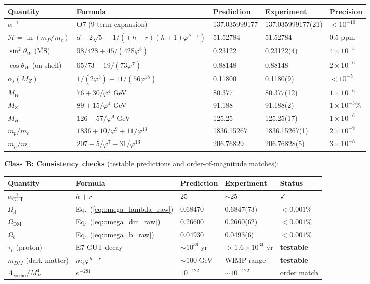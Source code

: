\documentclass[11pt,a4paper]{article}
\begin{document}
\begin{center}
\begin{tabular}{|l|l|l|l|l|}
\hline
\textbf{Quantity} & \textbf{Formula} & \textbf{Prediction} & \textbf{Experiment} & \textbf{Precision} \\
\hline
$\alpha^{-1}$ & O7 (9-term expansion) & 137.035999177 & 137.035999177(21) & $< 10^{-10}$ \\
$\mathcal{H} = \ln(m_P/m_e)$ & $d - 2\sqrt{5} - 1/((h{-}r)(h{+}1)\varphi^{h-r})$ & 51.52784 & 51.52784 & 0.5 ppm \\
$\sin^2\theta_W$ ($\overline{\text{MS}}$) & $98/428 + 45/(428\varphi^8)$ & 0.23122 & 0.23122(4) & $4 \times 10^{-5}$ \\
$\cos\theta_W$ (on-shell) & $65/73 - 19/(73\varphi^7)$ & 0.88148 & 0.88148 & $2 \times 10^{-6}$ \\
$\alpha_s(M_Z)$ & $1/(2\varphi^3) - 11/(56\varphi^{18})$ & 0.11800 & 0.1180(9) & $< 10^{-5}$ \\
$M_W$ & $76 + 30/\varphi^4$ GeV & 80.377 & 80.377(12) & $1 \times 10^{-6}$ \\
$M_Z$ & $89 + 15/\varphi^4$ GeV & 91.188 & 91.188(2) & $1 \times 10^{-3}\%$ \\
$M_H$ & $126 - 57/\varphi^9$ GeV & 125.25 & 125.25(17) & $1 \times 10^{-6}$ \\
$m_p/m_e$ & $1836 + 10/\varphi^{9} + 11/\varphi^{13}$ & 1836.15267 & 1836.15267(1) & $2 \times 10^{-9}$ \\
$m_\mu/m_e$ & $207 - 5/\varphi^{7} - 31/\varphi^{13}$ & 206.76829 & 206.76828(5) & $3 \times 10^{-8}$ \\
\hline
\end{tabular}
\end{center}

\textbf{Class B: Consistency checks} (testable predictions and order-of-magnitude matches):

\begin{center}
\begin{tabular}{|l|l|l|l|l|}
\hline
\textbf{Quantity} & \textbf{Formula} & \textbf{Prediction} & \textbf{Experiment} & \textbf{Status} \\
\hline
$\alpha_{\text{GUT}}^{-1}$ & $h + r$ & 25 & $\sim 25$ & $\checkmark$ \\
$\Omega_\Lambda$ & Eq.~(\ref{eq:omega_lambda_raw}) & 0.68470 & 0.6847(73) & $< 0.001\%$ \\
$\Omega_{\text{DM}}$ & Eq.~(\ref{eq:omega_dm_raw}) & 0.26600 & 0.2660(62) & $< 0.001\%$ \\
$\Omega_b$ & Eq.~(\ref{eq:omega_b_raw}) & 0.04930 & 0.0493(6) & $< 0.001\%$ \\
$\tau_p$ (proton) & E7 GUT decay & $\sim 10^{36}$ yr & $> 1.6 \times 10^{34}$ yr & \textbf{testable} \\
$m_{DM}$ (dark matter) & $m_e \varphi^{h-r}$ & $\sim 100$ GeV & WIMP range & \textbf{testable} \\
$\Lambda_{\text{cosmo}}/M_P^4$ & $e^{-281}$ & $10^{-122}$ & $\sim 10^{-122}$ & order match \\
\hline
\end{tabular}
\end{center}
\end{document}
